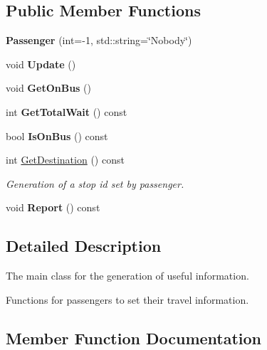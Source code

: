 \subsection*{Public Member Functions}
\begin{DoxyCompactItemize}
\item 
\mbox{\label{classPassenger_a5c3addb9a6fd03e5e5642ed844e2702c}} 
{\bfseries Passenger} (int=-\/1, std\+::string=\char`\"{}Nobody\char`\"{})
\item 
\mbox{\label{classPassenger_a960de3b29fc17a2c2d79c0b79d5cf299}} 
void {\bfseries Update} ()
\item 
\mbox{\label{classPassenger_ae2ba639cfef39781ac079778578bd9fe}} 
void {\bfseries Get\+On\+Bus} ()
\item 
\mbox{\label{classPassenger_a25158560f790ef7ef06d94c414b34f25}} 
int {\bfseries Get\+Total\+Wait} () const
\item 
\mbox{\label{classPassenger_a2acf008ec444afcc859b914ee24add0e}} 
bool {\bfseries Is\+On\+Bus} () const
\item 
int \hyperlink{classPassenger_a49db0ee527377aae6077df190a11501c}{Get\+Destination} () const
\begin{DoxyCompactList}\small\item\em Generation of a stop id set by passenger. \end{DoxyCompactList}\item 
\mbox{\label{classPassenger_ac54ce797e412a4895febe10f07dc5df5}} 
void {\bfseries Report} () const
\end{DoxyCompactItemize}


\subsection{Detailed Description}
The main class for the generation of useful information. 

Functions for passengers to set their travel information. 

\subsection{Member Function Documentation}
\mbox{\label{classPassenger_a49db0ee527377aae6077df190a11501c}} 
